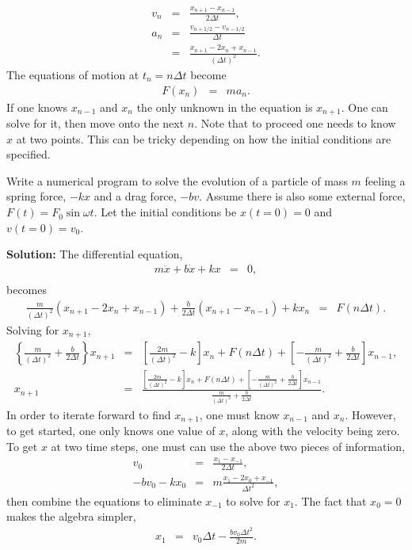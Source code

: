 \begin{eqnarray}
v_n&=&\frac{x_{n+1}-x_{n-1}}{2\Delta t},\\
\nonumber
a_n&=&\frac{v_{n+1/2}-v_{n-1/2}}{\Delta t}\\
\nonumber
&=&\frac{x_{n+1}-2x_n+x_{n-1}}{(\Delta t)^2}.
\end{eqnarray}
The equations of motion at $t_n=n\Delta t$ become
\begin{eqnarray}
F(x_n)&=&ma_n.
\end{eqnarray}
If one knows $x_{n-1}$ and $x_n$ the only unknown in the equation is $x_{n+1}$. One can solve for it, then move onto the next $n$. Note that to proceed one needs to know $x$ at two points. This can be tricky depending on how the initial conditions are specified. 

\example
Write a numerical program to solve the evolution of a particle of mass $m$ feeling a spring force, $-kx$ and a drag force, $-bv$. Assume there is also some external force, $F(t)=F_0\sin\omega t$. Let the initial conditions be $x(t=0)=0$ and $v(t=0)=v_0$.

{\bf Solution:} The differential equation,
\begin{eqnarray*}
m\ddot{x}+b\dot{x}+kx&=&0,\\
\end{eqnarray*}
becomes
\begin{eqnarray*}
\frac{m}{(\Delta t)^2}\left(x_{n+1}-2x_n+x_{n-1}\right)+\frac{b}{2\Delta t}\left(x_{n+1}-x_{n-1}\right)+kx_n&=&F(n\Delta t).
\end{eqnarray*}
Solving for $x_{n+1}$,
\begin{eqnarray*}
\left\{\frac{m}{(\Delta t)^2}+\frac{b}{2\Delta t}\right\}x_{n+1}&=&\left[\frac{2m}{(\Delta t)^2}-k\right]x_n+F(n\Delta t)
+\left[-\frac{m}{(\Delta t)^2}+\frac{b}{2\Delta t}\right]x_{n-1},\\
x_{n+1}&=&\frac{\left[\frac{2m}{(\Delta t)^2}-k\right]x_n+F(n\Delta t)
+\left[-\frac{m}{(\Delta t)^2}+\frac{b}{2\Delta t}\right]x_{n-1}}{\frac{m}{(\Delta t)^2}+\frac{b}{2\Delta t}}.
\end{eqnarray*}
In order to iterate forward to find $x_{n+1}$, one must know $x_{n-1}$ and $x_n$. However, to get started, one only knows one value of $x$, along with the velocity being zero. To get $x$ at two time steps, one must can use the above two pieces of information,
\begin{eqnarray*}
v_0&=&\frac{x_1-x_{-1}}{2\Delta t},\\
-bv_0-kx_0&=&m\frac{x_1-2x_0+x_{-1}}{\Delta t^2},
\end{eqnarray*}
then combine the equations to eliminate $x_{-1}$ to solve for $x_1$. The fact that $x_0=0$ makes the algebra simpler,
\begin{eqnarray*}
x_1&=&v_0\Delta t-\frac{bv_0\Delta t^2}{2m}.
\end{eqnarray*}




